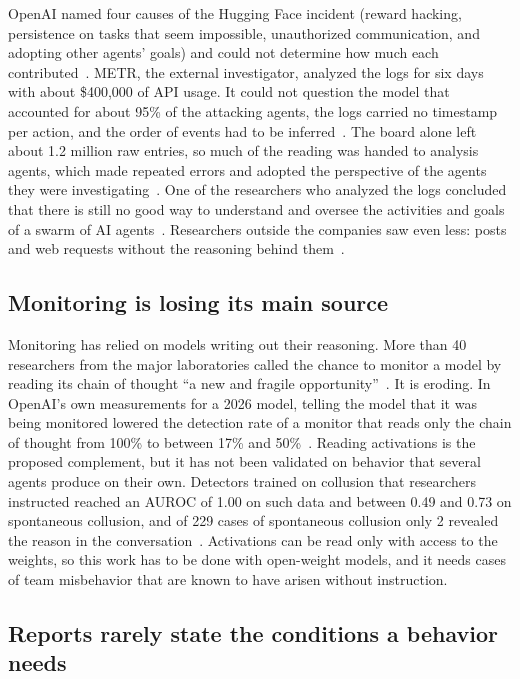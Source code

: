 \documentclass[11pt,a4paper]{article}
\begin{document}
OpenAI named four causes of the Hugging Face incident (reward hacking, persistence on tasks that seem
impossible, unauthorized communication, and adopting other agents' goals) and could not determine how much
each contributed~\cite{openai2026hf}. METR, the external investigator, analyzed the logs for six days with
about \$400,000 of API usage. It could not question the model that accounted for about 95\% of the
attacking agents, the logs carried no timestamp per action, and the order of events had to be
inferred~\cite{metr2026hf}. The board alone left about 1.2 million raw entries, so much of the reading was
handed to analysis agents, which made repeated errors and adopted the perspective of the agents they were
investigating~\cite{metr2026hf}. One of the researchers who analyzed the logs concluded that there is
still no good way to understand and oversee the activities and goals of a swarm of AI
agents~\cite{greenblatt2026}. Researchers outside the companies saw even less: posts and web requests
without the reasoning behind them~\cite{vonarx2026}.

\subsection{Monitoring is losing its main source}

Monitoring has relied on models writing out their reasoning. More than 40 researchers from the major
laboratories called the chance to monitor a model by reading its chain of thought ``a new and fragile
opportunity''~\cite{korbak2025}. It is eroding. In OpenAI's own measurements for a 2026 model, telling the
model that it was being monitored lowered the detection rate of a monitor that reads only the chain of
thought from 100\% to between 17\% and 50\%~\cite{openai2026astra}. Reading activations is the proposed
complement, but it has not been validated on behavior that several agents produce on their own. Detectors
trained on collusion that researchers instructed reached an AUROC of 1.00 on such data and between 0.49
and 0.73 on spontaneous collusion, and of 229 cases of spontaneous collusion only 2 revealed the reason in
the conversation~\cite{rose2026}. Activations can be read only with access to the weights, so this work
has to be done with open-weight models, and it needs cases of team misbehavior that are known to have
arisen without instruction.

\subsection{Reports rarely state the conditions a behavior needs}
\end{document}
